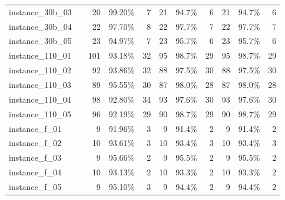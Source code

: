 \documentclass[12pt,a4paper,openright,twoside]{book}
\begin{document}
\begin{table}[H]
{\begin{tabular}{|ll|rrr|rrr|rrr|}
instance\_30b\_03              &     &      20  &    99.20\%  &   7 &  21  &    94.7\%  &   6  &  21  &    94.7\%  &   6  \\  
instance\_30b\_04              &     &      22  &    97.70\%  &   8 &  22  &    97.7\%  &   7  &  22  &    97.7\%  &   7  \\  
instance\_30b\_05              &     &      23  &    94.97\%  &   7 &  23  &    95.7\%  &   6  &  23  &    95.7\%  &   6  \\  
instance\_110\_01             &     &      101  &  93.18\%  &   32 &  95  &  98.7\%  &   29   &  95  &  98.7\%  &   29  \\        
instance\_110\_02             &     &      92  &   93.86\%  &   32 &  88  &  97.5\%  &   30   &  88  &  97.5\%  &   30  \\        
instance\_110\_03             &     &      89  &  95.55\%  &   30  &  87  &   98.0\%  &   28  &  87  &   98.0\%  &   28  \\     
instance\_110\_04             &     &      98  &  92.80\%  &   34  &  93  &   97.6\%  &   30  &  93  &   97.6\%  &   30  \\     
instance\_110\_05             &     &      96  &  92.19\%  &   29  &  90  &  98.7\%  &   29   &  90  &  98.7\%  &   29  \\
instance\_f\_01               &     &      9  &    91.96\%  &   3  &  9  &    91.4\%  &   2   &  9  &    91.4\%  &   2  \\  
instance\_f\_02               &     &      10  &    93.61\%  &   3 &  10  &    93.4\%  &   3  &  10  &    93.4\%  &   3  \\  
instance\_f\_03               &     &      9  &    95.66\%  &   2  &  9  &    95.5\%  &   2   &  9  &    95.5\%  &   2  \\  
instance\_f\_04               &     &      10  &    93.13\%  &   2 &  10  &    93.3\%  &   2  &  10  &    93.3\%  &   2  \\  
instance\_f\_05               &     &     9  &    95.10\%  &   3   &  9  &    94.4\%  &   2   &  9  &    94.4\%  &   2  \\
 \hline
\end{tabular}
}
\end{table}
\end{document}
